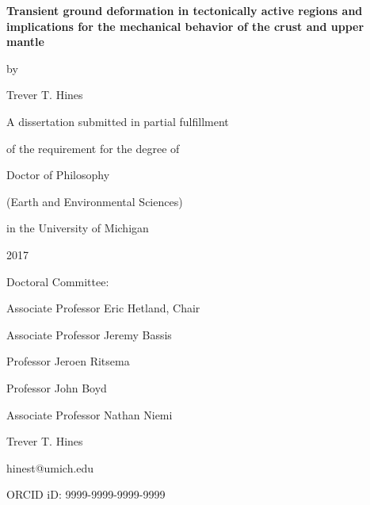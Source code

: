 \documentclass[letterpaper,12pt,oneside]{book}
\begin{document}
\frontmatter %

\thispagestyle{empty} %
\begin{center}
\vspace*{1.0in}
\textbf{\large{Transient ground deformation in tectonically active regions and implications for the mechanical behavior of the crust and upper mantle}}

\vspace*{0.2in}
by

\vspace*{0.2in}
Trever T. Hines 

\vspace*{1.0in}
A dissertation submitted in partial fulfillment

of the requirement for the degree of 

Doctor of Philosophy

(Earth and Environmental Sciences)

in the University of Michigan

2017
\end{center}
\vspace*{1.0in}
Doctoral Committee:

\vspace*{0.1in}
\hspace*{0.2in}
Associate Professor Eric Hetland, Chair

\hspace*{0.2in}
Associate Professor Jeremy Bassis

\hspace*{0.2in}
Professor Jeroen Ritsema

\hspace*{0.2in}
Professor John Boyd

\hspace*{0.2in}
Associate Professor Nathan Niemi

\newpage

\thispagestyle{empty} %
\begin{center}
\vspace*{1.0in}
Trever T. Hines

hinest@umich.edu

ORCID iD: 9999-9999-9999-9999
\end{center}
\newpage
\end{document}
